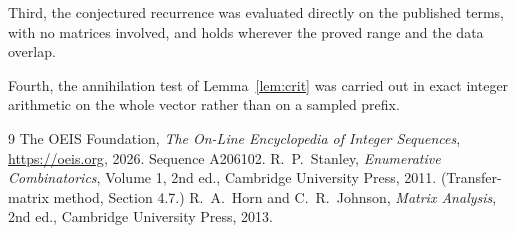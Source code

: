 \documentclass[11pt,a4paper]{article}
\theoremstyle{plain}
\theoremstyle{definition}
\begin{document}
Third, the conjectured recurrence was evaluated directly on the published terms, with no
matrices involved, and holds wherever the proved range and the data overlap.

Fourth, the annihilation test of Lemma~\ref{lem:crit} was carried out in exact integer
arithmetic on the whole vector rather than on a sampled prefix.

\begin{thebibliography}{9}
 The OEIS Foundation, \emph{The On-Line Encyclopedia of Integer
Sequences}, \url{https://oeis.org}, 2026. Sequence A206102.
 R.~P.~Stanley, \emph{Enumerative Combinatorics}, Volume 1, 2nd ed.,
Cambridge University Press, 2011. (Transfer-matrix method, Section 4.7.)
 R.~A.~Horn and C.~R.~Johnson, \emph{Matrix Analysis}, 2nd ed., Cambridge
University Press, 2013.
\end{thebibliography}
\end{document}
